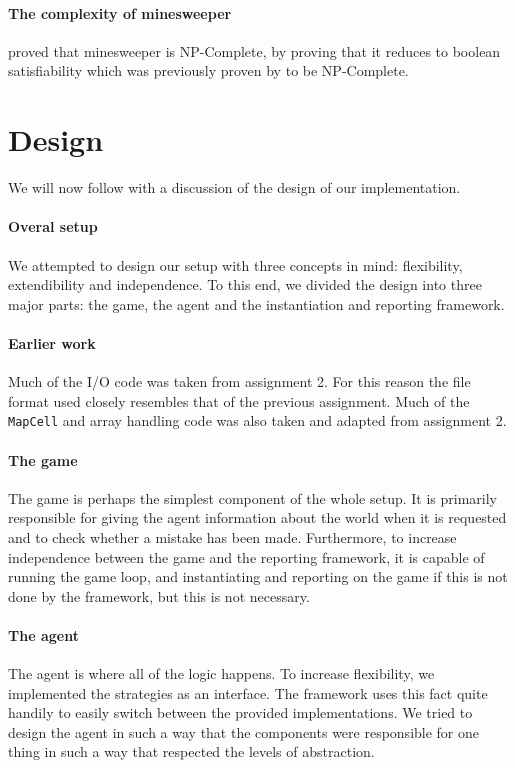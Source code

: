 \documentclass[british]{article}
\newcommand{\code}[1]{\texttt{#1}}
\begin{document}
\paragraph{The complexity of minesweeper} \cite{Kaye00} proved that minesweeper is NP-Complete, by proving that it reduces to boolean satisfiability which was previously proven by \cite{Cook71} to be NP-Complete.
\section{Design}
\label{design}
We will now follow with a discussion of the design of our implementation.
\paragraph{Overal setup} We attempted to design our setup with three concepts in mind: flexibility, extendibility and independence. To this end, we divided the design into three major parts: the game, the agent and the instantiation and reporting framework.
\paragraph{Earlier work} Much of the I/O code was taken from assignment 2. For this reason the file format used closely resembles that of the previous assignment. Much of the \code{MapCell} and array handling code was also taken and adapted from assignment 2.
\paragraph{The game} The game is perhaps the simplest component of the whole setup. It is primarily responsible for giving the agent information about the world when it is requested and to check whether a mistake has been made. Furthermore, to increase independence between the game and the reporting framework, it is capable of running the game loop, and instantiating and reporting on the game if this is not done by the framework, but this is not necessary.
\paragraph{The agent} The agent is where all of the logic happens. To increase flexibility, we implemented the strategies as an interface. The framework uses this fact quite handily to easily switch between the provided implementations. We tried to design the agent in such a way that the components were responsible for one thing in such a way that respected the levels of abstraction.
\end{document}
